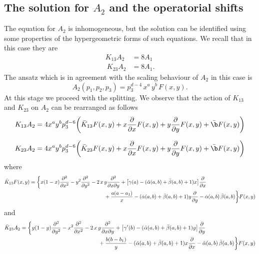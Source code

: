 \documentclass[a4paper,11pt,openright,twoside]{book}
\numberwithin{equation}{section}
\begin{document}
{{\subsection{The solution for $A_2$ and the operatorial shifts}
The equation for $A_2$ is inhomogeneous, but the solution can be identified using some properties of the hypergeometric forms of such equations. We recall that in this case they are 
\begin{align}
K_{13}A_2 &= 8 A_1\label{inhom}\\\
K_{23}A_2 &= 8A_1.\label{inhom1}
\end{align}
The ansatz which is in agreement with the scaling behaviour of $A_2$  in this case is 
\begin{equation}
A_2(p_1,p_2,p_3)=p_3^{d - 4}\,x^a\,y^b\,F(x,y).
\end{equation}
At this stage we proceed with the splitting. We observe that the action of $K_{13}$ and $K_{23}$ on $A_2$ can be rearranged as follows
\begin{align}
K_{13} A_2&=4 x^a y^b p_3^{d -6}\bigg( \bar{K}_{13}F(x,y) +x\frac{\partial}{\partial x} F(x,y)+y\frac{\partial}{\partial y} F(x,y)+\bar{\b}F(x,y)\bigg)\label{rep}\\[1.5ex]
K_{23} A_2&=4 x^a y^b p_3^{d -6}\bigg( \bar{K}_{23}F(x,y)  +x\frac{\partial}{\partial x} F(x,y)+y\frac{\partial}{\partial y} F(x,y)+\bar{\b}F(x,y)\bigg)\label{rep2}
\end{align}
where
\begin{align}
\label{k1bar}
\bar{K}_{13}F(x,y)&=\bigg\{x(1-x) \frac{\partial^2}{\partial x^2} - y^2 \frac{\partial^2}{\partial y^2} - 2 \, x \, y \frac{\partial^2}{\partial x \partial y} +\big[  \gamma(a)- (\tilde\alpha(a,b) + \bar\beta(a,b) + 1) x \big] \frac{\partial}{\partial x} \notag\\
&\hspace{5cm}+ \frac{a (a-a_1)}{x} - (\tilde\alpha(a,b) + \bar\beta(a,b) + 1) y \frac{\partial}{\partial y}  - \tilde\alpha(a,b) \, \bar\beta (a,b)\bigg\} F(x,y)
\end{align}
and 
\begin{align}
\label{k2bar}
\bar{K}_{23} A_2&=\bigg\{ y(1-y) \frac{\partial^2}{\partial y^2} - x^2 \frac{\partial^2}{\partial x^2} - 2 \, x \, y \frac{\partial^2}{\partial x \partial y} +  \big[ \gamma'(b) - (\tilde\alpha(a,b) +\bar \beta(a,b) + 1) y \big] \frac{\partial}{\partial y}\notag\\
&\hspace{5cm}+  \frac{b(b- b_1)}{y} - (\tilde\alpha(a,b) + \bar\beta(a,b) + 1) x \frac{\partial}{\partial x}  - \tilde\alpha(a,b) \, \bar\beta(a,b) \bigg\} F(x,y)

\end{align}}}
\end{document}
